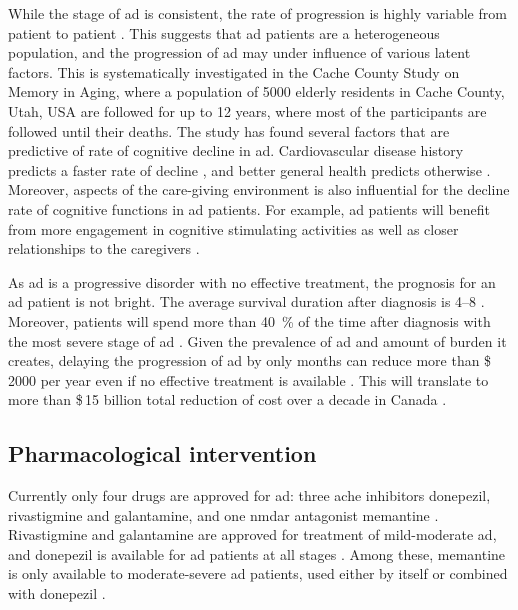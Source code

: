 While the stage of \gls{ad} is consistent, the rate of progression is highly variable from patient to patient \citep{komarova11, tschanz11}. This suggests that \gls{ad} patients are a heterogeneous population, and the progression of \gls{ad} may under influence of various latent factors. This is systematically investigated in the Cache County Study on Memory in Aging, where a population of \num{5000} elderly residents in Cache County, Utah, USA are followed for up to \num{12} years, where most of the participants are followed until their deaths. The study has found several factors that are predictive of rate of cognitive decline in \gls{ad}. Cardiovascular disease history predicts a faster rate of decline \citep{mielke07}, and better general health predicts otherwise \citep{leoutsakos12}. Moreover, aspects of the care-giving environment is also influential for the decline rate of cognitive functions in \gls{ad} patients. For example, \gls{ad} patients will benefit from more engagement in cognitive stimulating activities \citep{treiber11} as well as closer relationships to the caregivers \citep{norton09}.

As \gls{ad} is a progressive disorder with no effective treatment, the prognosis for an \gls{ad} patient is not bright. The average survival duration after diagnosis is \SIrange{4}{8}{\year} \citep{larson04, helzner08}. Moreover, patients will spend more than \SI{40}{\percent} of the time after diagnosis with the most severe stage of \gls{ad} \citep{arrighi10}. Given the prevalence of \gls{ad} and amount of burden it creates, delaying the progression of \gls{ad} by only months can reduce more than \$\,\num{2000} per year even if no effective treatment is available \citep{zhu06}. This will translate to more than \$\,15 billion total reduction of cost over a decade in Canada \citep{adc10}.

\subsection{Pharmacological intervention \label{treatment}}
Currently only four drugs are approved for \gls{ad}: three \gls{ache} inhibitors donepezil, rivastigmine and galantamine, and one \gls{nmdar} antagonist memantine \citep{nelson15}. Rivastigmine and galantamine are approved for treatment of mild-moderate \gls{ad}, and donepezil is available for \gls{ad} patients at all stages \citep{bassil09, smith09}. Among these, memantine is only available to moderate-severe \gls{ad} patients, used either by itself or combined with donepezil \citep{nelson15}.


